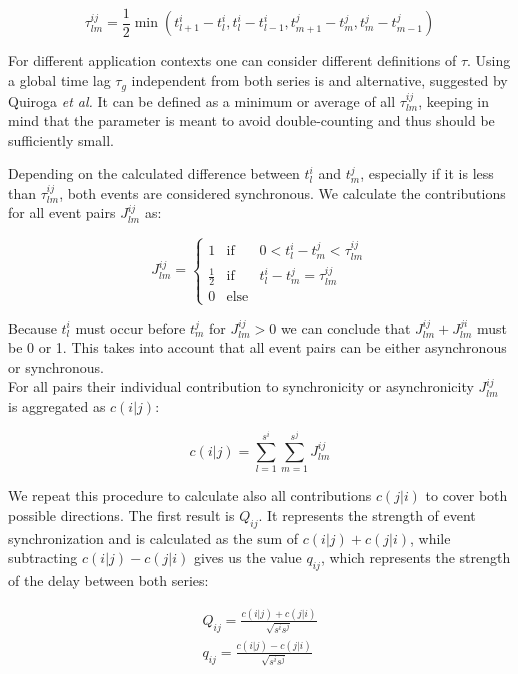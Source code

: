 \documentclass[a4paper,10pt]{scrbook}
\begin{document}
\begin{equation}
\tau_{lm}^{ij}=\frac{1}{2}\min\left( t_{l+1}^i - t_l^i, t_l^i - t_{l-1}^i, t_{m+1}^j - t_m^j, t_m^j - t_{m-1}^j \right)
\label{eqn:time_lag}
\end{equation}

For different application contexts one can consider different definitions of $\tau$. Using a global time lag $\tau_g$ independent from both series is and alternative, suggested by Quiroga \textit{et al.} It can be defined as a minimum or average of all $\tau_{lm}^{ij}$, keeping in mind that the parameter is meant to avoid double-counting and thus should be sufficiently small.

Depending on the calculated difference between $t_l^i$ and $t_m^j$, especially if it is less than $\tau_{lm}^{ij}$, both events are considered synchronous. We calculate the contributions for all event pairs $J_{lm}^{ij}$ as: 

\begin{equation}
J_{lm}^{ij}= \left\lbrace
\begin{matrix}
1 & \text{if} & 0 < t_l^i-t_m^j < \tau_{lm}^{ij}\\
\frac{1}{2} & \text{if} & t_l^i-t_m^j = \tau_{lm}^{ij}\\
0 & \text{else}
\end{matrix}
\right.
\label{eqn}
\end{equation}

Because $t_l^i$ must occur before $t_m^j$ for $J_{lm}^{ij}>0$ we can conclude that $J_{lm}^{ij}+J_{lm}^{ji}$ must be 0 or 1. This takes into account that all event pairs can be either asynchronous or synchronous.\\

For all pairs their individual contribution to synchronicity or asynchronicity $J_{lm}^{ij}$ is aggregated as $c(i|j)$:

\begin{equation}
c(i|j) = \sum_{l=1}^{s^i}\sum_{m=1}^{s^j} J_{lm}^{ij}
\label{eqn}
\end{equation}

We repeat this procedure to calculate also all contributions $c(j|i)$ to cover both possible directions. 
The first result is $Q_{ij}$. It represents the strength of event synchronization and is calculated as the sum of $c(i|j) + c(j|i)$, while subtracting $c(i|j) - c(j|i)$ gives us the value $q_{ij}$, which represents the strength of the delay between both series:

\begin{subequations}
\label{eqn:ESresult}
\begin{align}
Q_{ij} = \frac{c(i|j)+c(j|i)}{\sqrt{s^i s^j}}\label{eqn:ES_str}\\
q_{ij} = \frac{c(i|j)-c(j|i)}{\sqrt{s^i s^j}}\label{eqn:ES_del}
\end{align}
\end{subequations}
\end{document}
